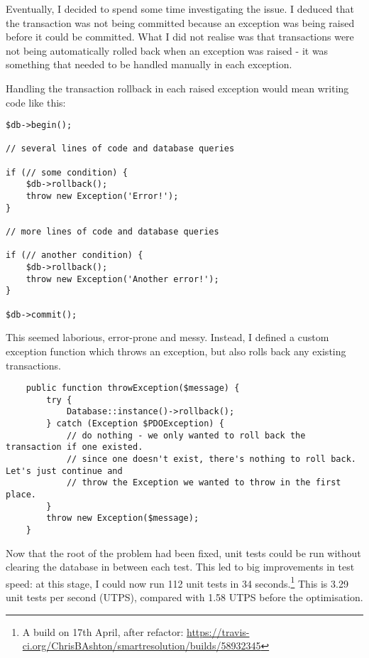 Eventually, I decided to spend some time investigating the issue. I deduced that the transaction was not being committed because an exception was being raised before it could be committed. What I did not realise was that transactions were not being automatically rolled back when an exception was raised - it was something that needed to be handled manually in each exception.

Handling the transaction rollback in each raised exception would mean writing code like this:

\begin{minipage}{\textwidth}
\begin{lstlisting}
$db->begin();

// several lines of code and database queries

if (// some condition) {
    $db->rollback();
    throw new Exception('Error!');
}

// more lines of code and database queries

if (// another condition) {
    $db->rollback();
    throw new Exception('Another error!');
}

$db->commit();
\end{lstlisting}
\end{minipage}

This seemed laborious, error-prone and messy. Instead, I defined a custom exception function which throws an exception, but also rolls back any existing transactions.

\begin{minipage}{\textwidth}
\begin{lstlisting}
    public function throwException($message) {
        try {
            Database::instance()->rollback();
        } catch (Exception $PDOException) {
            // do nothing - we only wanted to roll back the transaction if one existed.
            // since one doesn't exist, there's nothing to roll back. Let's just continue and
            // throw the Exception we wanted to throw in the first place.
        }
        throw new Exception($message);
    }
\end{lstlisting}
\end{minipage}

Now that the root of the problem had been fixed, unit tests could be run without clearing the database in between each test. This led to big improvements in test speed: at this stage, I could now run 112 unit tests in 34 seconds.\footnote{A build on 17th April, after refactor: \url{https://travis-ci.org/ChrisBAshton/smartresolution/builds/58932345}} This is 3.29 unit tests per second (UTPS), compared with 1.58 UTPS before the optimisation.

